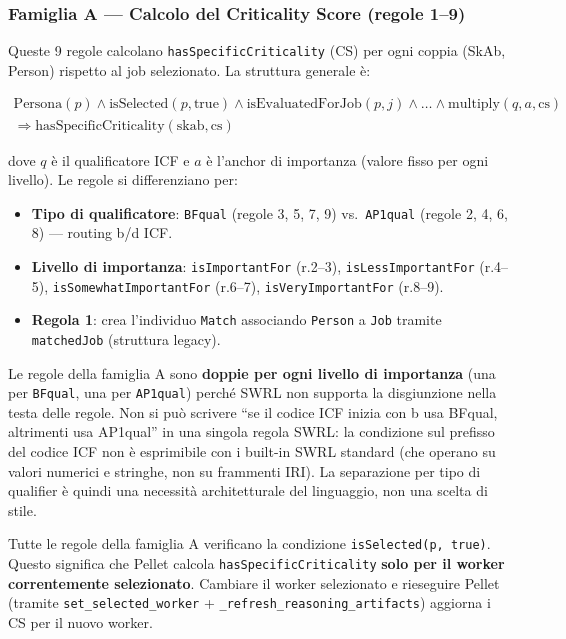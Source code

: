 \documentclass[a4paper,12pt]{article}
\begin{document}
\subsubsection{Famiglia A --- Calcolo del Criticality Score (regole 1--9)}

Queste 9 regole calcolano \texttt{hasSpecificCriticality} (CS) per ogni
coppia (SkAb, Person) rispetto al job selezionato. La struttura generale
\`{e}:

\begin{multline*}
\text{Persona}(p) \wedge \text{isSelected}(p, \text{true}) \wedge
\text{isEvaluatedForJob}(p, j) \wedge \ldots \wedge \text{multiply}(q, a, \text{cs}) \\
\Rightarrow \text{hasSpecificCriticality}(\text{skab}, \text{cs})
\end{multline*}

dove $q$ \`{e} il qualificatore ICF e $a$ \`{e} l'anchor di importanza
(valore fisso per ogni livello). Le regole si differenziano per:
\begin{itemize}[noitemsep]
  \item \textbf{Tipo di qualificatore}: \texttt{BFqual} (regole 3, 5, 7, 9) vs.\
        \texttt{AP1qual} (regole 2, 4, 6, 8) --- routing b/d ICF.
  \item \textbf{Livello di importanza}: \texttt{isImportantFor} (r.2--3),
        \texttt{isLessImportantFor} (r.4--5), \texttt{isSomewhat\-ImportantFor}
        (r.6--7), \texttt{isVeryImportantFor} (r.8--9).
  \item \textbf{Regola 1}: crea l'individuo \texttt{Match} associando
        \texttt{Person} a \texttt{Job} tramite \texttt{matchedJob} (struttura legacy).
\end{itemize}

Le regole della famiglia A sono \textbf{doppie per ogni livello di
importanza} (una per \texttt{BFqual}, una per \texttt{AP1qual}) perch\'{e}
SWRL non supporta la disgiunzione nella testa delle regole. Non si pu\`{o}
scrivere ``se il codice ICF inizia con b usa BFqual, altrimenti usa AP1qual''
in una singola regola SWRL: la condizione sul prefisso del codice ICF non
\`{e} esprimibile con i built-in SWRL standard (che operano su valori
numerici e stringhe, non su frammenti IRI). La separazione per tipo di
qualifier \`{e} quindi una necessit\`{a} architetturale del linguaggio,
non una scelta di stile.

\begin{infobox}
Tutte le regole della famiglia A verificano la condizione
\texttt{isSelected(p, true)}. Questo significa che Pellet calcola
\texttt{hasSpecificCriticality} \textbf{solo per il worker correntemente
selezionato}. Cambiare il worker selezionato e rieseguire Pellet (tramite
\texttt{set\_selected\_worker} + \texttt{\_\allowbreak{}refresh\_\allowbreak{}reasoning\_\allowbreak{}artifacts})
aggiorna i CS per il nuovo worker.
\end{infobox}
\end{document}
